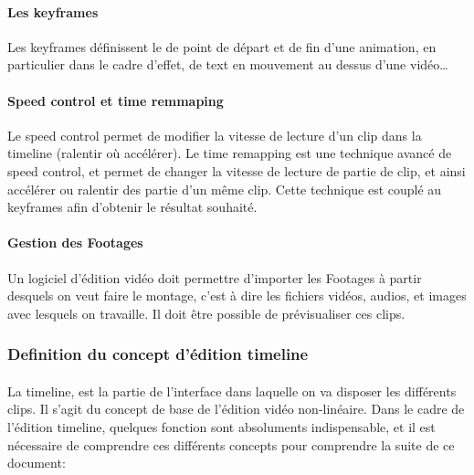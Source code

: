 \paragraph{Les keyframes}
Les keyframes définissent le de point de départ et de fin d'une animation,
en particulier dans le cadre d'effet, de text en mouvement au dessus
d'une vidéo\ldots

\paragraph{Speed control et time remmaping}
Le speed control permet de modifier la vitesse de lecture d'un clip dans la
timeline (ralentir où accélérer). Le time remapping est une technique avancé
de speed control, et permet de changer la vitesse de lecture de partie de clip,
et ainsi accélérer ou ralentir des partie d'un même clip. Cette technique est
couplé au keyframes afin d'obtenir le résultat souhaité.

\paragraph{Gestion des Footages}
Un logiciel d'édition vidéo doit permettre d'importer les Footages à partir %
desquels on veut faire le montage, c'est à dire les fichiers vidéos, audios,
et images avec lesquels on travaille. Il doit être possible de prévisualiser ces
clips.

\subsubsection{Definition du concept d'édition timeline}
\paragraph{}
La timeline, est la partie de l'interface dans laquelle on va disposer les
différents clips. Il s'agit du concept de base de l'édition vidéo non-linéaire.
Dans le cadre de l'édition timeline, quelques fonction sont absoluments
indispensable, et il est nécessaire de comprendre ces différents concepts
pour comprendre la suite de ce document:

